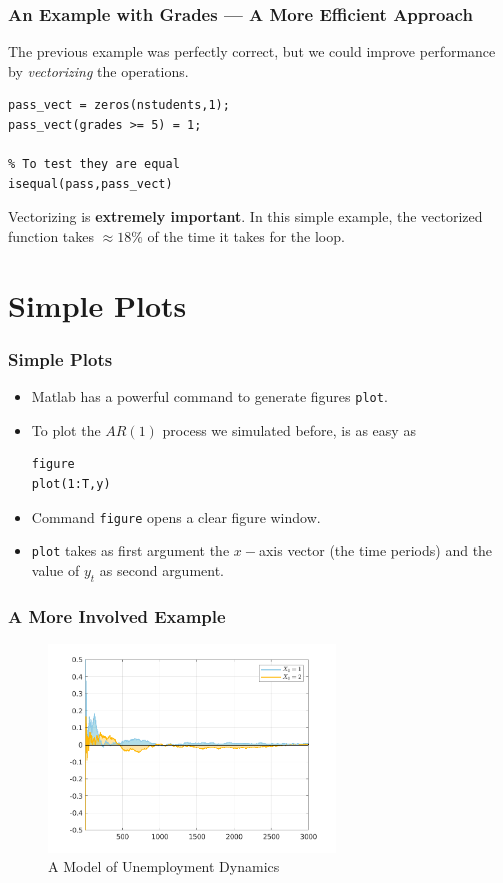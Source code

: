 \documentclass[11pt,xcolor={svgnames},aspectratio=169,usepdftitle=false,notheorems]{beamer}
\begin{document}
\begin{frame}[fragile]
    \frametitle{An Example with Grades --- A More Efficient Approach}
The previous example was perfectly correct, but we could improve performance by \alert{\textit{vectorizing}} the operations.

\begin{lstlisting}
pass_vect = zeros(nstudents,1);
pass_vect(grades >= 5) = 1;

% To test they are equal
isequal(pass,pass_vect)
\end{lstlisting}    

Vectorizing is \alert{\textbf{extremely important}}. In this simple example, the vectorized function takes $\approx 18\%$ of the time it takes for the loop.

\end{frame}

\section{Simple Plots}

\begin{frame}[fragile]
    \frametitle{Simple Plots}
    \begin{itemize}
        \item Matlab has a powerful command to generate figures \verb;plot;.
        \item To plot the $AR(1)$ process we simulated before, is as easy as
\begin{lstlisting}
figure
plot(1:T,y)
\end{lstlisting}
        \item Command \verb;figure; opens a clear figure window.
        \item \verb;plot; takes as first argument the $x-$axis vector (the time periods) and the value of $y_t$ as second argument.
    \end{itemize}
\end{frame}

\begin{frame}
    \frametitle{A More Involved Example}
\begin{figure}
    \centering
    \includegraphics[width = 0.68\textwidth]{../figures/unemployment_dynamics.png}
    \caption{A Model of Unemployment Dynamics}
    \label{fig:unemployment}
\end{figure}
\end{frame}
\end{document}
